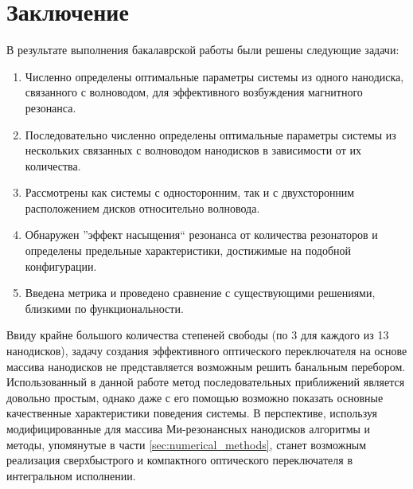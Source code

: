 \chapter{Заключение}

В результате выполнения бакалаврской работы были решены следующие задачи:

\begin{enumerate}[label=\arabic*)]
	\item Численно определены оптимальные параметры системы из одного нанодиска, связанного с волноводом, для эффективного возбуждения магнитного резонанса.
	\item Последовательно численно определены оптимальные параметры системы из нескольких связанных с волноводом нанодисков в зависимости от их количества.
	\item Рассмотрены как системы с односторонним, так и с двухсторонним расположением дисков относительно волновода.
	\item Обнаружен ''эффект насыщения`` резонанса от количества резонаторов и определены предельные характеристики, достижимые на подобной конфигурации.
	\item Введена метрика и проведено сравнение с существующими решениями, близкими по функциональности. 
\end{enumerate}

Ввиду крайне большого количества степеней свободы (по 3 для каждого из 13 нанодисков), задачу создания эффективного оптического переключателя на основе массива нанодисков не представляется возможным решить банальным перебором. Использованный в данной работе метод последовательных приближений является довольно простым, однако даже с его помощью возможно показать основные качественные характеристики поведения системы. В перспективе, используя модифицированные для массива Ми-резонансных нанодисков алгоритмы и методы, упомянутые в части \ref{sec:numerical_methods}, станет возможным реализация сверхбыстрого и компактного оптического переключателя в интегральном исполнении.